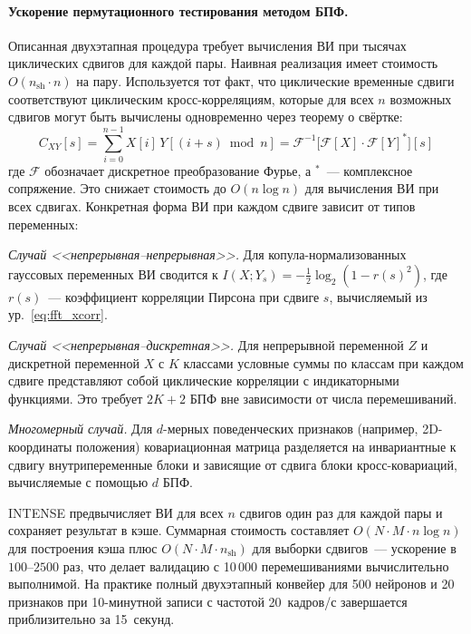 \paragraph{Ускорение пермутационного тестирования методом БПФ.}

Описанная двухэтапная процедура требует вычисления ВИ при тысячах циклических сдвигов для каждой пары. Наивная реализация имеет стоимость $O(n_{\text{sh}} \cdot n)$ на пару. Используется тот факт, что циклические временные сдвиги соответствуют циклическим кросс-корреляциям, которые для всех $n$ возможных сдвигов могут быть вычислены одновременно через теорему о свёртке:
\begin{equation}
\label{eq:fft_xcorr}
C_{XY}[s] = \sum_{i=0}^{n-1} X[i] \, Y[(i+s) \bmod n]
           = \mathcal{F}^{-1}\!\bigl[\mathcal{F}[X] \cdot \mathcal{F}[Y]^{*}\bigr][s]
\end{equation}
где $\mathcal{F}$ обозначает дискретное преобразование Фурье, а $^{*}$~--- комплексное сопряжение. Это снижает стоимость до $O(n \log n)$ для вычисления ВИ при всех сдвигах. Конкретная форма ВИ при каждом сдвиге зависит от типов переменных:

\textit{Случай <<непрерывная--непрерывная>>.} Для копула-нормализованных гауссовых переменных ВИ сводится к $I(X; Y_s) = -\tfrac{1}{2}\log_2(1 - r(s)^2)$, где $r(s)$~--- коэффициент корреляции Пирсона при сдвиге $s$, вычисляемый из ур.~\eqref{eq:fft_xcorr}.

\textit{Случай <<непрерывная--дискретная>>.} Для непрерывной переменной $Z$ и дискретной переменной $X$ с $K$ классами условные суммы по классам при каждом сдвиге представляют собой циклические корреляции с индикаторными функциями. Это требует $2K+2$ БПФ вне зависимости от числа перемешиваний.

\textit{Многомерный случай.} Для $d$-мерных поведенческих признаков (например, 2D-координаты положения) ковариационная матрица разделяется на инвариантные к сдвигу внутрипеременные блоки и зависящие от сдвига блоки кросс-ковариаций, вычисляемые с помощью $d$ БПФ.

INTENSE предвычисляет ВИ для всех $n$ сдвигов один раз для каждой пары и сохраняет результат в кэше. Суммарная стоимость составляет $O(N \cdot M \cdot n \log n)$ для построения кэша плюс $O(N \cdot M \cdot n_{\text{sh}})$ для выборки сдвигов~--- ускорение в $100$--$2500$ раз, что делает валидацию с 10\,000 перемешиваниями вычислительно выполнимой. На практике полный двухэтапный конвейер для 500 нейронов и 20 признаков при 10-минутной записи с частотой 20~кадров/с завершается приблизительно за 15~секунд.


